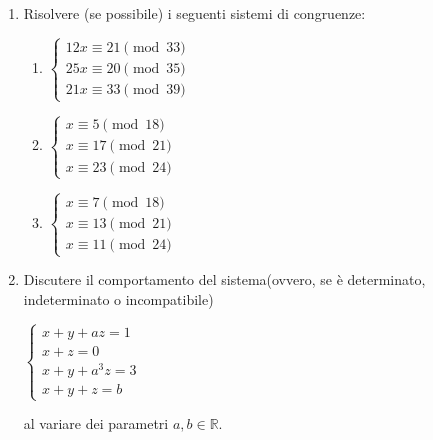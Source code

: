 \documentclass[fleqn]{article}
\begin{document}
\begin{enumerate}
   \item Risolvere (se possibile) i seguenti sistemi di congruenze:
   
   \begin{enumerate} 
      \item \begin{center} 
      $ \begin{cases}
         12x \equiv 21 \pmod{33} \\
         25x \equiv 20 \pmod{35} \\
         21x \equiv 33 \pmod{39} 
      \end{cases} $
      \end{center}
      \item \begin{center} 
      $ \begin{cases}
         x \equiv 5 \pmod{18} \\
         x \equiv 17 \pmod{21} \\
         x \equiv 23 \pmod{24} 
      \end{cases} $
      \end{center}
      \item \begin{center}
      $ \begin{cases}
         x \equiv 7 \pmod{18} \\
         x \equiv 13 \pmod{21} \\
         x \equiv 11 \pmod{24} 
      \end{cases} $
      \end{center}
   \end{enumerate}

   \item Discutere il comportamento del sistema(ovvero, se è determinato, indeterminato o incompatibile)
   \begin{center}
   $\begin{cases} 
      x + y + az = 1 \\
      x + z = 0 \\
      x + y + a^3z = 3 \\
      x + y + z = b
   \end{cases}$ \\
   \end{center}
   al variare dei parametri $a,b \in \mathbb{R}$.


\end{enumerate}
\end{document}
